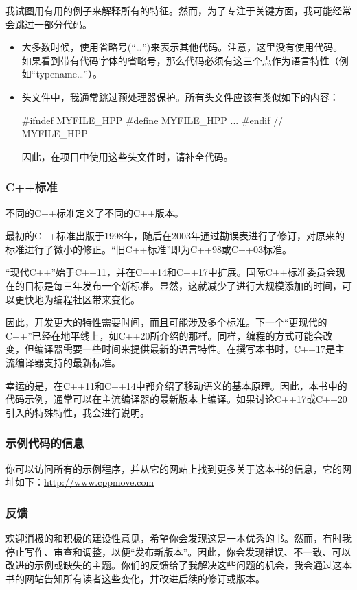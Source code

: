 我试图用有用的例子来解释所有的特征。然而，为了专注于关键方面，我可能经常会跳过一部分代码。

\begin{itemize}
\item 大多数时候，使用省略号(“…”)来表示其他代码。注意，这里没有使用代码。如果看到带有代码字体的省略号，那么代码必须有这三个点作为语言特性（例如“typename…”）。
\item 头文件中，我通常跳过预处理器保护。所有头文件应该有类似如下的内容：
\begin{cppcode}
#ifndef MYFILE_HPP
#define MYFILE_HPP
...
#endif // MYFILE_HPP
\end{cppcode}
	因此，在项目中使用这些头文件时，请补全代码。
\end{itemize}

\subsubsection{C++标准}

不同的C++标准定义了不同的C++版本。

最初的C++标准出版于1998年，随后在2003年通过勘误表进行了修订，对原来的标准进行了微小的修正。“旧C++标准”即为C++98或C++03标准。

“现代C++”始于C++11，并在C++14和C++17中扩展。国际C++标准委员会现在的目标是每三年发布一个新标准。显然，这就减少了进行大规模添加的时间，可以更快地为编程社区带来变化。

因此，开发更大的特性需要时间，而且可能涉及多个标准。下一个“更现代的C++”已经在地平线上，如C++20所介绍的那样。同样，编程的方式可能会改变，但编译器需要一些时间来提供最新的语言特性。在撰写本书时，C++17是主流编译器支持的最新标准。

幸运的是，在C++11和C++14中都介绍了移动语义的基本原理。因此，本书中的代码示例，通常可以在主流编译器的最新版本上编译。如果讨论C++17或C++20引入的特殊特性，我会进行说明。

\subsubsection{示例代码的信息}

你可以访问所有的示例程序，并从它的网站上找到更多关于这本书的信息，它的网址如下：\url{http://www.cppmove.com}

\subsubsection{反馈}

欢迎消极的和积极的建设性意见，希望你会发现这是一本优秀的书。然而，有时我停止写作、审查和调整，以便“发布新版本”。因此，你会发现错误、不一致、可以改进的示例或缺失的主题。你们的反馈给了我解决这些问题的机会，我会通过这本书的网站告知所有读者这些变化，并改进后续的修订或版本。

